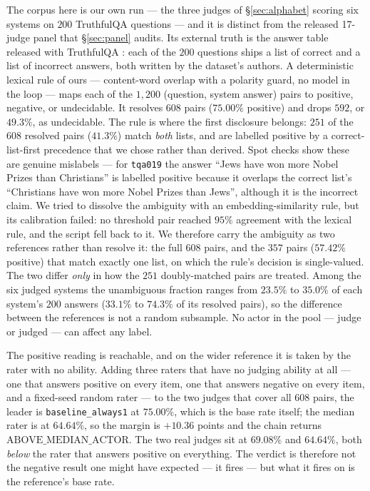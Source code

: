 \documentclass{article}
\begin{document}
The corpus here is our own run --- the three judges of \S\ref{sec:alphabet} scoring six systems on $200$ TruthfulQA questions --- and it is distinct from the released 17-judge panel that \S\ref{sec:panel} audits. Its external truth is the answer table released with TruthfulQA \cite{lin2022truthfulqa}: each of the $200$ questions ships a list of correct and a list of incorrect answers, both written by the dataset's authors. A deterministic lexical rule of ours --- content-word overlap with a polarity guard, no model in the loop --- maps each of the $1{,}200$ (question, system answer) pairs to positive, negative, or undecidable. It resolves $608$ pairs ($75.00\%$ positive) and drops $592$, or $49.3\%$, as undecidable. The rule is where the first disclosure belongs: $251$ of the $608$ resolved pairs ($41.3\%$) match \emph{both} lists, and are labelled positive by a correct-list-first precedence that we chose rather than derived. Spot checks show these are genuine mislabels --- for \texttt{tqa019} the answer ``Jews have won more Nobel Prizes than Christians'' is labelled positive because it overlaps the correct list's ``Christians have won more Nobel Prizes than Jews'', although it is the incorrect claim. We tried to dissolve the ambiguity with an embedding-similarity rule, but its calibration failed: no threshold pair reached $95\%$ agreement with the lexical rule, and the script fell back to it. We therefore carry the ambiguity as two references rather than resolve it: the full $608$ pairs, and the $357$ pairs ($57.42\%$ positive) that match exactly one list, on which the rule's decision is single-valued. The two differ \emph{only} in how the $251$ doubly-matched pairs are treated. Among the six judged systems the unambiguous fraction ranges from $23.5\%$ to $35.0\%$ of each system's $200$ answers ($33.1\%$ to $74.3\%$ of its resolved pairs), so the difference between the references is not a random subsample. No actor in the pool --- judge or judged --- can affect any label.

The positive reading is reachable, and on the wider reference it is taken by the rater with no ability. Adding three raters that have no judging ability at all --- one that answers positive on every item, one that answers negative on every item, and a fixed-seed random rater --- to the two judges that cover all $608$ pairs, the leader is \texttt{baseline\_always1} at $75.00\%$, which is the base rate itself; the median rater is at $64.64\%$, so the margin is $+10.36$ points and the chain returns $\mathrm{ABOVE\_MEDIAN\_ACTOR}$. The two real judges sit at $69.08\%$ and $64.64\%$, both \emph{below} the rater that answers positive on everything. The verdict is therefore not the negative result one might have expected --- it fires --- but what it fires on is the reference's base rate.
\end{document}
